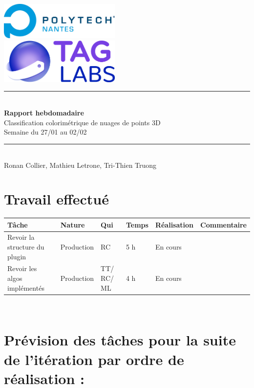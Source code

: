 \documentclass[12pt,titlepage,french]{article}
\begin{document}

\begin{titlepage}
\newcommand{\HRule}{\rule{\linewidth}{0.5mm}}
\center

  \includegraphics[width=0.45\textwidth]{../ressources/img_logos/logo_polytech.png}\\[1cm]
   
  \includegraphics[width=0.45\textwidth]{../ressources/img_logos/logo_taglabs.png}


\HRule \\[0.4cm]
{ \huge \bfseries Rapport hebdomadaire\\[0.15cm] }
Classification colorimétrique de nuages de points 3D\\
Semaine du 27/01 au 02/02
\HRule \\[1.5cm]
Ronan Collier,
Mathieu Letrone,
Tri-Thien Truong
\\[1cm]
\end{titlepage}

\section{Travail effectué}

\noindent\begin{tabularx}{17cm}{|p{2.5cm}|p{2.5cm}|p{1cm}|p{1.5cm}|p{2.5cm}|X|}
    \hline
    \textbf{Tâche} & \textbf{Nature} & \textbf{Qui} & \textbf{Temps} & \textbf{Réalisation} & \textbf{Commentaire} \\
    \hline
    Revoir la structure du plugin & Production & RC & 5 h & En cours & \\
    \hline
    Revoir les algos implémentés & Production & TT/ RC/ ML & 4 h & En cours & \\
    \hline
\end{tabularx} \\

\section{Prévision des tâches pour la suite de l'itération par ordre de réalisation :}
\end{document}
